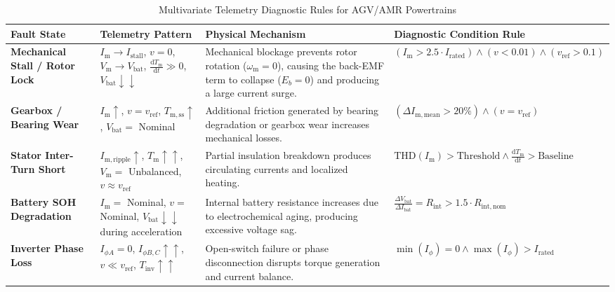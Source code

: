 \begin{table}[htbp]
\centering
\caption{Multivariate Telemetry Diagnostic Rules for AGV/AMR Powertrains}
\label{tab:diagnostic_matrix}
\small
\begin{tabular}{p{2.8cm}p{3.5cm}p{4.2cm}p{4.0cm}}
\toprule
\textbf{Fault State} & \textbf{Telemetry Pattern} & \textbf{Physical Mechanism} & \textbf{Diagnostic Condition Rule} \\
\midrule
\textbf{Mechanical Stall / Rotor Lock} & $I_{\mathrm{m}} \rightarrow I_{\mathrm{stall}}$, $v = 0$, $V_{\mathrm{m}} \rightarrow V_{\mathrm{bat}}$, $\frac{\mathrm{d}T_{\mathrm{m}}}{\mathrm{d}t} \gg 0$, $V_{\mathrm{bat}} \downarrow\downarrow$ & Mechanical blockage prevents rotor rotation ($\omega_{\mathrm{m}}=0$), causing the back-EMF term to collapse ($E_b = 0$) and producing a large current surge. & $(I_{\mathrm{m}} > 2.5 \cdot I_{\mathrm{rated}})\land(v < 0.01)\land(v_{\mathrm{ref}} > 0.1)$ \\
\addlinespace
\textbf{Gearbox / Bearing Wear} & $I_{\mathrm{m}}\uparrow$, $v=v_{\mathrm{ref}}$, $T_{\mathrm{m,ss}}\uparrow$, $V_{\mathrm{bat}} =$ Nominal & Additional friction generated by bearing degradation or gearbox wear increases mechanical losses. & $(\Delta I_{\mathrm{m,mean}} > 20\%) \land (v=v_{\mathrm{ref}})$ \\
\addlinespace
\textbf{Stator Inter-Turn Short} & $I_{\mathrm{m,ripple}}\uparrow$, $T_{\mathrm{m}}\uparrow\uparrow$, $V_{\mathrm{m}} =$ Unbalanced, $v \approx v_{\mathrm{ref}}$ & Partial insulation breakdown produces circulating currents and localized heating. & $\mathrm{THD}(I_{\mathrm{m}}) > \mathrm{Threshold} \land \frac{\mathrm{d}T_{\mathrm{m}}}{\mathrm{d}t} > \mathrm{Baseline} $ \\
\addlinespace
\textbf{Battery SOH Degradation} & $I_{\mathrm{m}} =$ Nominal, $v =$ Nominal, $V_{\mathrm{bat}}\downarrow\downarrow$ during acceleration & Internal battery resistance increases due to electrochemical aging, producing excessive voltage sag. & $\frac{\Delta V_{\mathrm{bat}}} {\Delta I_{\mathrm{bat}}} = R_{\mathrm{int}} > 1.5 \cdot R_{\mathrm{int,nom}} $ \\
\addlinespace
\textbf{Inverter Phase Loss} & $I_{\phi A}=0$, $I_{\phi B,C}\uparrow\uparrow$, $v\ll v_{\mathrm{ref}}$, $T_{\mathrm{inv}}\uparrow\uparrow$ & Open-switch failure or phase disconnection disrupts torque generation and current balance. & $\min(I_\phi)=0 \land \max(I_\phi)>I_{\mathrm{rated}} $ \\
\bottomrule
\end{tabular}
\end{table}

